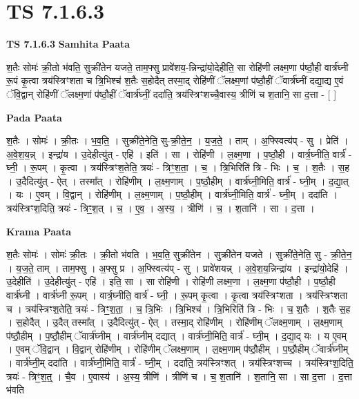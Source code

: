 \documentclass[17pt]{extarticle}
\begin{document}
\section{ TS 7.1.6.3 }

\textbf{TS 7.1.6.3 } \newline
\textbf{Samhita Paata} \newline

श॒तैः सोमः॑ क्री॒तो भ॑वति॒ सुक्री॑तेन यजते॒ ताम॒फ्सु प्रावे॑शय॒-न्निन्द्रा॑यो॒देहीति॒ सा रोहि॑णी लक्ष्म॒णा प॑ष्ठौ॒ही वार्त्र॑घ्नी रू॒पं कृ॒त्वा त्रय॑स्त्रिꣳशता च त्रि॒भिश्च॑ श॒तैः स॒होदैत् तस्मा॒द् रोहि॑णीं ॅलक्ष्म॒णां प॑ष्ठौ॒हीं ॅवार्त्र॑घ्नीं दद्या॒द्य ए॒वं ॅवि॒द्वान् रोहि॑णीं ॅलक्ष्म॒णां प॑ष्ठौ॒हीं ॅवार्त्र॑घ्नीं॒ ददा॑ति॒ त्रय॑स्त्रिꣳशच्चै॒वास्य॒ त्रीणि॑ च श॒तानि॒ सा द॒त्ता - [  ] \newline

\textbf{Pada Paata} \newline

श॒तैः । सोमः॑ । क्री॒तः । भ॒व॒ति॒ । सुक्री॑ते॒नेति॒ सु-क्री॒ते॒न॒ । य॒ज॒ते॒ । ताम् । अ॒फ्स्वित्य॑प् - सु । प्रेति॑ । अ॒वे॒श॒य॒न्न् । इन्द्रा॑य । उ॒देहीत्यु॑त् - एहि॑ । इति॑ । सा । रोहि॑णी । ल॒क्ष्म॒णा । प॒ष्ठौ॒ही । वार्त्र॒घ्नीति॒ वार्त्र॑ - घ्नी॒ । रू॒पम् । कृ॒त्वा । त्रय॑स्त्रिꣳश॒तेति॒ त्रयः॑ - त्रिꣳ॒॒श॒ता॒ । च॒ । त्रि॒भिरिति॑ त्रि - भिः । च॒ । श॒तैः । स॒ह । उ॒दैदित्यु॑त् - ऐत् । तस्मा᳚त् । रोहि॑णीम् । ल॒क्ष्म॒णाम् । प॒ष्ठौ॒हीम् । वार्त्र॑घ्नी॒मिति॒ वार्त्र॑ - घ्नी॒म् । द॒द्या॒त् । यः । ए॒वम् । वि॒द्वान् । रोहि॑णीम् । ल॒क्ष्म॒णाम् । प॒ष्ठौ॒हीम् । वार्त्र॑घ्नी॒मिति॒ वार्त्र॑ - घ्नी॒म् । ददा॑ति । त्रय॑स्त्रिꣳश॒दिति॒ त्रयः॑ - त्रिꣳ॒॒श॒त् । च॒ । ए॒व॒ । अ॒स्य॒ । त्रीणि॑ । च॒ । श॒तानि॑ । सा । द॒त्ता ।  \newline


\textbf{Krama Paata} \newline

श॒तैः सोमः॑ । सोमः॑ क्री॒तः । क्री॒तो भ॑वति । भ॒व॒ति॒ सुक्री॑तेन । सुक्री॑तेन यजते । सुक्री॑ते॒नेति॒ सु - क्री॒ते॒न॒ । य॒ज॒ते॒ ताम् । ताम॒फ्सु । अ॒फ्सु प्र । अ॒फ्स्वित्य॑प् - सु । प्रावे॑शयन्न् । अ॒वे॒श॒य॒न्निन्द्रा॑य । इन्द्रा॑यो॒देहि॑ । उ॒देहीति॑ । उ॒देहीत्यु॑त् - एहि॑ । इति॒ सा । सा रोहि॑णी । रोहि॑णी लक्ष्म॒णा । ल॒क्ष्म॒णा प॑ष्ठौ॒ही । प॒ष्ठौ॒ही वार्त्र॑घ्नी । वार्त्र॑घ्नी रू॒पम् । वार्त्र॒घ्नीति॒ वार्त्र॑ - घ्नी॒ । रू॒पम् कृ॒त्वा । कृ॒त्वा त्रय॑स्त्रिꣳशता । त्रय॑स्त्रिꣳशता च । त्रय॑स्त्रिꣳश॒तेति॒ त्रयः॑ - त्रिꣳ॒॒श॒ता॒ । च॒ त्रि॒भिः । त्रि॒भिश्च॑ । त्रि॒भिरिति॑ त्रि - भिः । च॒ श॒तैः । श॒तैः स॒ह । स॒होदैत् । उ॒दैत् तस्मा᳚त् । उ॒दैदित्यु॑त् - ऐत् । तस्मा॒द् रोहि॑णीम् । रोहि॑णीम् ॅलक्ष्म॒णाम् । ल॒क्ष्म॒णाम् प॑ष्ठौ॒हीम् । प॒ष्ठौ॒हीम् ॅवार्त्र॑घ्नीम् । वार्त्र॑घ्नीम् दद्यात् । वार्त्र॑घ्नी॒मिति॒ वार्त्र॑ - घ्नी॒म् । द॒द्या॒द् यः । य ए॒वम् । ए॒वम् ॅवि॒द्वान् । वि॒द्वान् रोहि॑णीम् । रोहि॑णीम् ॅलक्ष्म॒णाम् । ल॒क्ष्म॒णाम् प॑ष्ठौ॒हीम् । प॒ष्ठौ॒हीम् ॅवार्त्र॑घ्नीम् । वार्त्र॑घ्नी॒म् ददा॑ति । वार्त्र॑घ्नी॒मिति॒ वार्त्र॑ - घ्नी॒म् । ददा॑ति॒ त्रय॑स्त्रिꣳशत् । त्रय॑स्त्रिꣳशच्च । त्रय॑स्त्रिꣳश॒दिति॒ त्रयः॑ - त्रिꣳ॒॒श॒त्॒ । चै॒व । ए॒वास्य॑ । अ॒स्य॒ त्रीणि॑ । त्रीणि॑ च । च॒ श॒तानि॑ । श॒तानि॒ सा । सा द॒त्ता । द॒त्ता भ॑वति \newline
\end{document}
